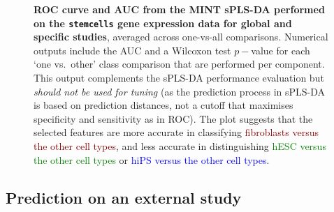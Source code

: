 \documentclass[]{book}
\begin{document}
\begin{figure}

{\centering {}

}

\caption{\textbf{ROC curve and AUC from the MINT sPLS-DA performed on the \texttt{stemcells} gene expression data for global and specific studies}, averaged across one-vs-all comparisons. Numerical outputs include the AUC and a Wilcoxon test \(p-\)value for each `one vs.~other' class comparison that are performed per component. This output complements the sPLS-DA performance evaluation but \emph{should not be used for tuning} (as the prediction process in sPLS-DA is based on prediction distances, not a cutoff that maximises specificity and sensitivity as in ROC). The plot suggests that the selected features are more accurate in classifying \textcolor{darkred}{fibroblasts versus the other cell types}, and less accurate in distinguishing \textcolor{green}{hESC versus the other cell types} or \textcolor{blue}{hiPS versus the other cell types}.}\label{fig:MINT-auc}
\end{figure}



\hypertarget{detour:mint:predict}{%
\subsection{Prediction on an external study}\label{detour:mint:predict}}
\end{document}
